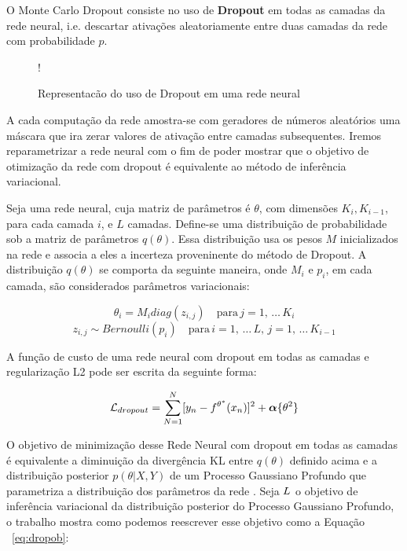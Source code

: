 O Monte Carlo Dropout consiste no uso de \textbf{Dropout} em todas as camadas da rede
neural, i.e. descartar ativações aleatoriamente entre duas camadas da rede com
probabilidade $p$.\\

\begin{figure}
  \centering
  \resizebox {\columnwidth} {!} {}
  \label{fig:dropout}
  \caption{Representacão do uso de Dropout em uma rede neural}
\end{figure}


A cada computação da rede amostra-se com geradores de números aleatórios uma
máscara que ira zerar valores de ativação entre camadas subsequentes. Iremos
reparametrizar a rede neural com o fim de poder mostrar que o objetivo de
otimização da rede com dropout é equivalente ao método de inferência variacional.

Seja uma rede neural, cuja matriz de parâmetros é $\theta$, com dimensões
$K_i,K_{i-1}$, para cada camada $i$, e $L$ camadas. Define-se uma distribuição
de probabilidade sob a matriz de parâmetros $q(\theta)$.
Essa distribuição usa os pesos $M$ inicializados na rede e associa a eles a incerteza proveninente do
método de Dropout. A distribuição $q(\theta)$ se comporta da seguinte maneira,
onde $M_i$ e $p_i$, em cada camada, são considerados parâmetros variacionais:

\newcommand{\diag}{\mathop{\mathrm{diag}}}

\[
  \theta_i   = M_i   diag (z_{i,j}) \quad \text{para} \, j=1, \, \dots  \,K_i
\] 
\[
  z_{i,j}  \sim Bernoulli(p_i) \quad  \text{para} \, i=1, \, \dots \, L, \, j=1, \, \dots \, K_{i-1}
\]   


A função de custo de uma rede neural com dropout em todas as camadas  e
regularização L2 pode ser escrita da seguinte forma:

\begin{equation}
  \mathcal{L}_{dropout} = \sum^N_{N=1} [y_n - \mathnormal{f}^{\theta^*}(x_n)]^2
  + \boldsymbol{\alpha}\{\theta^2\}
\label{eq:dropob}
\end{equation}


O objetivo de minimização desse Rede Neural com dropout em todas as camadas é
equivalente a diminuição da divergência KL entre $q(\theta)$ definido acima e a distribuição
posterior $p(\theta | X,Y)$ de um Processo Gaussiano Profundo que parametriza a
distribuição dos parâmetros da rede \citep{dropbayes}. Seja $\mathnormal{L}$ o
objetivo de inferência variacional da distribuição posterior do Processo Gaussiano Profundo, o trabalho
\citep{dropbayes} mostra como podemos reescrever esse objetivo como a Equação ~\ref{eq:dropob}:

